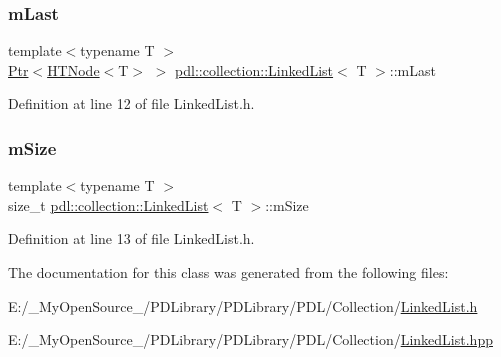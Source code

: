 \subsubsection{\texorpdfstring{mLast}{mLast}}
{\footnotesize\ttfamily template$<$typename T $>$ \\
\mbox{\hyperlink{classpdl_1_1memory_1_1_ptr}{Ptr}}$<$\mbox{\hyperlink{classpdl_1_1collection_1_1_h_t_node}{H\+T\+Node}}$<$T$>$ $>$ \mbox{\hyperlink{classpdl_1_1collection_1_1_linked_list}{pdl\+::collection\+::\+Linked\+List}}$<$ T $>$\+::m\+Last\hspace{0.3cm}{\ttfamily [protected]}}



Definition at line 12 of file Linked\+List.\+h.

\mbox{\label{classpdl_1_1collection_1_1_linked_list_ad15deaf5bbdc32d4efe316468f9a5f32}} 
\subsubsection{\texorpdfstring{mSize}{mSize}}
{\footnotesize\ttfamily template$<$typename T $>$ \\
size\+\_\+t \mbox{\hyperlink{classpdl_1_1collection_1_1_linked_list}{pdl\+::collection\+::\+Linked\+List}}$<$ T $>$\+::m\+Size\hspace{0.3cm}{\ttfamily [protected]}}



Definition at line 13 of file Linked\+List.\+h.



The documentation for this class was generated from the following files\+:\begin{DoxyCompactItemize}
\item 
E\+:/\+\_\+\+My\+Open\+Source\+\_\+/\+P\+D\+Library/\+P\+D\+Library/\+P\+D\+L/\+Collection/\mbox{\hyperlink{_linked_list_8h}{Linked\+List.\+h}}\item 
E\+:/\+\_\+\+My\+Open\+Source\+\_\+/\+P\+D\+Library/\+P\+D\+Library/\+P\+D\+L/\+Collection/\mbox{\hyperlink{_linked_list_8hpp}{Linked\+List.\+hpp}}\end{DoxyCompactItemize}
